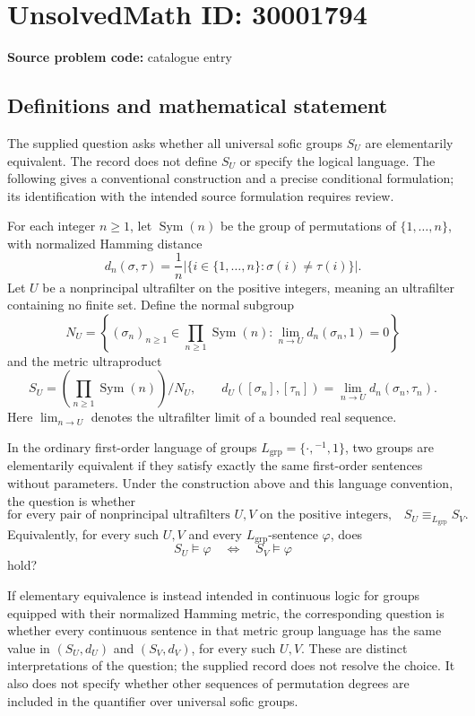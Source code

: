 \documentclass[11pt]{article}
\begin{document}
\section*{UnsolvedMath ID: 30001794}
\textbf{Source problem code:} catalogue entry
\subsection{Definitions and mathematical statement}
The supplied question asks whether all universal sofic groups \(S_U\) are elementarily equivalent. The record does not define \(S_U\) or specify the logical language. The following gives a conventional construction and a precise conditional formulation; its identification with the intended source formulation requires review.

For each integer \(n\geq 1\), let \(\operatorname{Sym}(n)\) be the group of permutations of \(\{1,\ldots,n\}\), with normalized Hamming distance
\[
 d_n(\sigma,\tau)=\frac{1}{n}\bigl|\{i\in\{1,\ldots,n\}:\sigma(i)\ne\tau(i)\}\bigr|.
\]
Let \(U\) be a nonprincipal ultrafilter on the positive integers, meaning an ultrafilter containing no finite set. Define the normal subgroup
\[
 N_U=\left\{(\sigma_n)_{n\geq1}\in\prod_{n\geq1}\operatorname{Sym}(n):\lim_{n\to U}d_n(\sigma_n,1)=0\right\}
\]
and the metric ultraproduct
\[
 S_U=\left(\prod_{n\geq1}\operatorname{Sym}(n)\right)/N_U,
 \qquad
 d_U([\sigma_n],[\tau_n])=\lim_{n\to U}d_n(\sigma_n,\tau_n).
\]
Here \(\lim_{n\to U}\) denotes the ultrafilter limit of a bounded real sequence.

In the ordinary first-order language of groups \(L_{\mathrm{grp}}=\{\cdot,{}^{-1},1\}\), two groups are elementarily equivalent if they satisfy exactly the same first-order sentences without parameters. Under the construction above and this language convention, the question is whether
\[
 \text{for every pair of nonprincipal ultrafilters }U,V\text{ on the positive integers,}
 \quad S_U\equiv_{L_{\mathrm{grp}}}S_V.
\]
Equivalently, for every such \(U,V\) and every \(L_{\mathrm{grp}}\)-sentence \(\varphi\), does
\[
 S_U\models\varphi\quad\Longleftrightarrow\quad S_V\models\varphi
\]
hold?

If elementary equivalence is instead intended in continuous logic for groups equipped with their normalized Hamming metric, the corresponding question is whether every continuous sentence in that metric group language has the same value in \((S_U,d_U)\) and \((S_V,d_V)\), for every such \(U,V\). These are distinct interpretations of the question; the supplied record does not resolve the choice. It also does not specify whether other sequences of permutation degrees are included in the quantifier over universal sofic groups.
\end{document}
